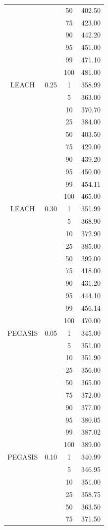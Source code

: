 \documentclass[a4paper,12pt,twoside,openany]{report}
\begin{document}
\begin{longtable}{*{4}{c}}
	&	& 50	& 402.50 \\*
	&	& 75	& 423.00 \\*
	&	& 90	& 442.20 \\*
	&	& 95	& 451.00 \\*
	&	& 99	& 471.10 \\*
	&	& 100	& 481.00 \\*
\midrule
LEACH	& 0.25	& 1	& 358.99 \\*
	&	& 5	& 363.00 \\*
	&	& 10	& 370.70 \\*
	&	& 25	& 384.00 \\*
	&	& 50	& 403.50 \\*
	&	& 75	& 429.00 \\*
	&	& 90	& 439.20 \\*
	&	& 95	& 450.00 \\*
	&	& 99	& 454.11 \\*
	&	& 100	& 465.00 \\*
\midrule
LEACH	& 0.30	& 1	& 351.99 \\*
	&	& 5	& 368.90 \\*
	&	& 10	& 372.90 \\*
	&	& 25	& 385.00 \\*
	&	& 50	& 399.00 \\*
	&	& 75	& 418.00 \\*
	&	& 90	& 431.20 \\*
	&	& 95	& 444.10 \\*
	&	& 99	& 456.14 \\*
	&	& 100	& 470.00 \\*
\midrule
PEGASIS	& 0.05	& 1	& 345.00 \\*
	&	& 5	& 351.00 \\*
	&	& 10	& 351.90 \\*
	&	& 25	& 356.00 \\*
	&	& 50	& 365.00 \\*
	&	& 75	& 372.00 \\*
	&	& 90	& 377.00 \\*
	&	& 95	& 380.05 \\*
	&	& 99	& 387.02 \\*
	&	& 100	& 389.00 \\*
\midrule
PEGASIS	& 0.10	& 1	& 340.99 \\*
	&	& 5	& 346.95 \\*
	&	& 10	& 351.00 \\*
	&	& 25	& 358.75 \\*
	&	& 50	& 363.50 \\*
	&	& 75	& 371.50 \\*

\end{longtable}
\end{document}
